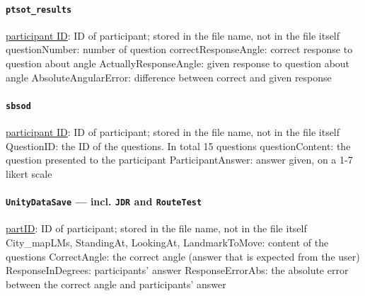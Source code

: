 \documentclass[11pt]{article}
\begin{document}
	\paragraph{\texttt{ptsot\_results}}
		\begin{itemize}
			\costitem \underline{participant ID}: ID of participant; stored in the file name, not in the file itself
			\costitem questionNumber: number of question
			\costitem correctResponseAngle: correct response to question about angle
			\costitem ActuallyResponseAngle: given response to question about angle
			\costitem AbsoluteAngularError: difference between correct and given response
		\end{itemize}
	\paragraph{\texttt{sbsod}}
		\begin{itemize}
			\costitem \underline{participant ID}: ID of participant; stored in the file name, not in the file itself
			\costitem QuestionID: the ID of the questions. In total 15 questions
			\costitem questionContent: the question presented to the participant
			\costitem ParticipantAnswer: answer given, on a 1-7 likert scale 
		\end{itemize}
	\paragraph{\texttt{UnityDataSave} --- incl. \texttt{JDR} and \texttt{RouteTest}}
		\begin{itemize}
			\costitem \underline{partID}: ID of participant; stored in the file name, not in the file itself
			\costitem City\_mapLMs, StandingAt, LookingAt, LandmarkToMove: content of the questions
			\costitem CorrectAngle: the correct angle (answer that is expected from the user)
			\costitem ResponseInDegrees: participants' answer
			\costitem ResponseErrorAbs: the absolute error between the correct angle and participants' answer			
		\end{itemize}
\end{document}
